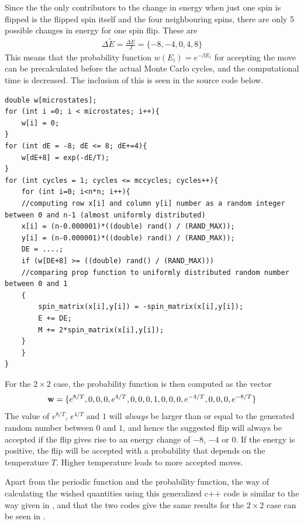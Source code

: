 Since the the only contributors to the change in energy when just one spin is flipped is the flipped spin itself and the four neighbouring spins, there are only 5 possible changes in energy for one spin flip. These are
\begin{align}
	\Delta \tilde{E} = \frac{\Delta E}{J} = \{ -8 , -4 , 0 , 4 , 8 \}
\end{align}
This means that the probability function $w(E_i) = e^{-\beta E_i}$ for accepting the move can be precalculated before the actual Monte Carlo  cycles, and the computational time is decreased. 
The inclusion of this is seen in the source code below.
\begin{lstlisting}
double w[microstates];
for (int i =0; i < microstates; i++){
    w[i] = 0;
}
for (int dE = -8; dE <= 8; dE+=4){
    w[dE+8] = exp(-dE/T);
}
for (int cycles = 1; cycles <= mccycles; cycles++){
    for (int i=0; i<n*n; i++){
    //computing row x[i] and column y[i] number as a random integer between 0 and n-1 (almost uniformly distributed)
    x[i] = (n-0.000001)*((double) rand() / (RAND_MAX));  
    y[i] = (n-0.000001)*((double) rand() / (RAND_MAX));
    DE = ....;
    if (w[DE+8] >= ((double) rand() / (RAND_MAX)))
    //comparing prop function to uniformly distributed random number between 0 and 1
    {
        spin_matrix(x[i],y[i]) = -spin_matrix(x[i],y[i]);
        E += DE;
        M += 2*spin_matrix(x[i],y[i]);
    }
    }
}
\end{lstlisting}
For the $2\times 2$ case, the probability function is then computed as the vector
\begin{align}
	\mbox{\textbf{w}} = \{e^{8/T}, 0, 0, 0, e^{4/T}, 0, 0, 0, 1, 0, 0, 0, e^{-4/T}, 0, 0, 0, e^{-8/T} \}
\end{align}
The value of $e^{8/T}$, $e^{4/T}$ and $1$ will \textit{always} be larger than or equal to the generated random number between $0$ and $1$, and hence the suggested flip will always be accepted if the flip gives rise to an energy change of $-8$, $-4$ or $0$. 
If the energy is positive, the flip will be accepted with a probability that depends on the temperature $T$. 
Higher temperature leads to more accepted moves.

Apart from the periodic function and the probability function, the way of calculating the wished quantities using this generalized c++ code is similar to the way given in , and that the two codes give the same results for the $2\times 2$ case can be seen in .   